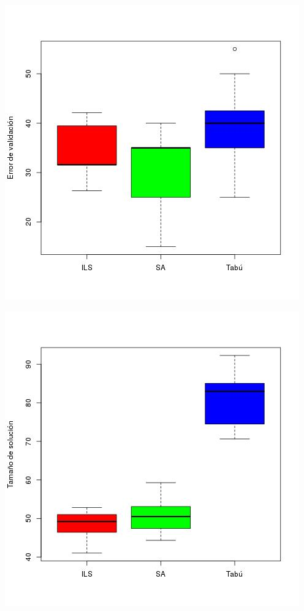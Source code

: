 \documentclass[11pt]{article}
\begin{document}
\begin{center}
  \includegraphics[scale=0.4]{val_errors.jpeg}~\\[1cm]
\end{center}

\begin{center}
  \includegraphics[scale=0.4]{sizes.jpeg}~\\[1cm]
\end{center}
\end{document}
